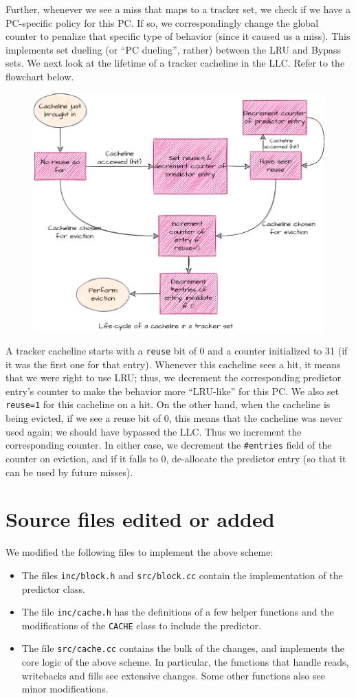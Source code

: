 \documentclass[11pt, swedish, openany]{book}
\begin{document}
Further, whenever we see a miss that maps to a tracker set, we check if we have a PC-specific policy for this PC. If so, we correspondingly change the global counter to penalize that specific type of behavior (since it caused us a miss). This implements set dueling (or ``PC dueling'', rather) between the LRU and Bypass sets.
We next look at the lifetime of a tracker cacheline in the LLC. Refer to the flowchart below.
\begin{figure}[H]
    \centering
    \includegraphics[width=0.85\linewidth]{images/lifecycle.png}
\end{figure}
A tracker cacheline starts with a \texttt{reuse} bit of 0 and a counter initialized to 31 (if it was the first one for that entry). Whenever this cacheline sees a hit, it means that we were right to use LRU; thus, we decrement the corresponding predictor entry's counter to make the behavior more ``LRU-like'' for this PC. We also set \texttt{reuse=1} for this cacheline on a hit. On the other hand, when the cacheline is being evicted, if we see a reuse bit of 0, this means that the cacheline was never used again; we should have bypassed the LLC. Thus we increment the corresponding counter. In either case, we decrement the \texttt{\#entries} field of the counter on eviction, and if it falls to 0, de-allocate the predictor entry (so that it can be used by future misses).

\section{Source files edited or added}
We modified the following files to implement the above scheme:
\begin{itemize}
    \item The files \texttt{inc/block.h} and \texttt{src/block.cc} contain the implementation of the predictor class.
    \item The file \texttt{inc/cache.h} has the definitions of a few helper functions and the modifications of the \texttt{CACHE} class to include the predictor.
    \item The file \texttt{src/cache.cc} contains the bulk of the changes, and implements the core logic of the above scheme. In particular, the functions that handle reads, writebacks and fills see extensive changes. Some other functions also see minor modifications.
\end{itemize}
\end{document}
